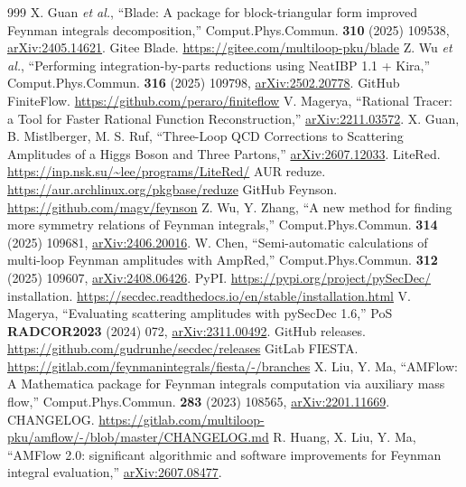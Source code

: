 \documentclass[a4paper,10pt]{ltjsarticle}
\begin{document}
\begin{thebibliography}{999}
 X. Guan \textit{et al.}, ``Blade: A package for block-triangular form improved Feynman integrals decomposition,'' Comput.Phys.Commun. \textbf{310} (2025) 109538, \href{https://arxiv.org/abs/2405.14621}{arXiv:2405.14621}.
 Gitee Blade. \url{https://gitee.com/multiloop-pku/blade}
 Z. Wu \textit{et al.}, ``Performing integration-by-parts reductions using NeatIBP 1.1 + Kira,'' Comput.Phys.Commun. \textbf{316} (2025) 109798, \href{https://arxiv.org/abs/2502.20778}{arXiv:2502.20778}.
 GitHub FiniteFlow. \url{https://github.com/peraro/finiteflow}
 V. Magerya, ``Rational Tracer: a Tool for Faster Rational Function Reconstruction,'' \href{https://arxiv.org/abs/2211.03572}{arXiv:2211.03572}.
 X. Guan, B. Mistlberger, M. S. Ruf, ``Three-Loop QCD Corrections to Scattering Amplitudes of a Higgs Boson and Three Partons,'' \href{https://arxiv.org/abs/2607.12033}{arXiv:2607.12033}.
 LiteRed. \url{https://inp.nsk.su/~lee/programs/LiteRed/}
 AUR reduze. \url{https://aur.archlinux.org/pkgbase/reduze}
 GitHub Feynson. \url{https://github.com/magv/feynson}
 Z. Wu, Y. Zhang, ``A new method for finding more symmetry relations of Feynman integrals,'' Comput.Phys.Commun. \textbf{314} (2025) 109681, \href{https://arxiv.org/abs/2406.20016}{arXiv:2406.20016}.
 W. Chen, ``Semi-automatic calculations of multi-loop Feynman amplitudes with AmpRed,'' Comput.Phys.Commun. \textbf{312} (2025) 109607, \href{https://arxiv.org/abs/2408.06426}{arXiv:2408.06426}.
 PyPI. \url{https://pypi.org/project/pySecDec/}
 installation. \url{https://secdec.readthedocs.io/en/stable/installation.html}
 V. Magerya, ``Evaluating scattering amplitudes with pySecDec 1.6,'' PoS \textbf{RADCOR2023} (2024) 072, \href{https://arxiv.org/abs/2311.00492}{arXiv:2311.00492}.
 GitHub releases. \url{https://github.com/gudrunhe/secdec/releases}
 GitLab FIESTA. \url{https://gitlab.com/feynmanintegrals/fiesta/-/branches}
 X. Liu, Y. Ma, ``AMFlow: A Mathematica package for Feynman integrals computation via auxiliary mass flow,'' Comput.Phys.Commun. \textbf{283} (2023) 108565, \href{https://arxiv.org/abs/2201.11669}{arXiv:2201.11669}.
 CHANGELOG. \url{https://gitlab.com/multiloop-pku/amflow/-/blob/master/CHANGELOG.md}
 R. Huang, X. Liu, Y. Ma, ``AMFlow 2.0: significant algorithmic and software improvements for Feynman integral evaluation,'' \href{https://arxiv.org/abs/2607.08477}{arXiv:2607.08477}.

\end{thebibliography}
\end{document}
